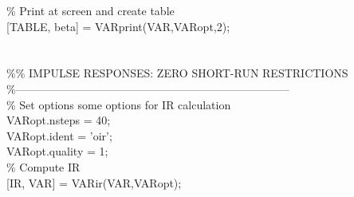 \hspace{1mm}\hspace{5mm} \textcolor{matlabgreen}{\% Print at screen and create table }\\ 
\hspace{1mm}\hspace{5mm} [TABLE, beta] = VARprint(VAR,VARopt,2); \\ 
\hspace{1mm}\hspace{5mm}  \\ 
\hspace{1mm}\hspace{5mm}  \\ 
\hspace{1mm}\hspace{5mm} \textcolor{matlabgreen}{\%}\textcolor{matlabgreen}{\% IMPULSE RESPONSES: ZERO SHORT-RUN RESTRICTIONS }\\ 
\hspace{1mm}\hspace{5mm} \textcolor{matlabgreen}{\%--------------------------------------------------------------------------  }\\ 
\hspace{1mm}\hspace{5mm} \textcolor{matlabgreen}{\% Set options some options \textcolor{matlabblue}{for} IR calculation }\\ 
\hspace{1mm}\hspace{5mm} \hspace{5mm} VARopt.nsteps = 40; \\ 
\hspace{1mm}\hspace{5mm} \hspace{5mm} VARopt.ident = \textcolor{matlabpurple}{'oir'}; \\ 
\hspace{1mm}\hspace{5mm} \hspace{5mm} VARopt.quality = 1; \\ 
\hspace{1mm}\hspace{5mm} \hspace{5mm} \textcolor{matlabgreen}{\% Compute IR }\\ 
\hspace{1mm}\hspace{5mm} \hspace{5mm} [IR, VAR] = VARir(VAR,VARopt); \\ 
